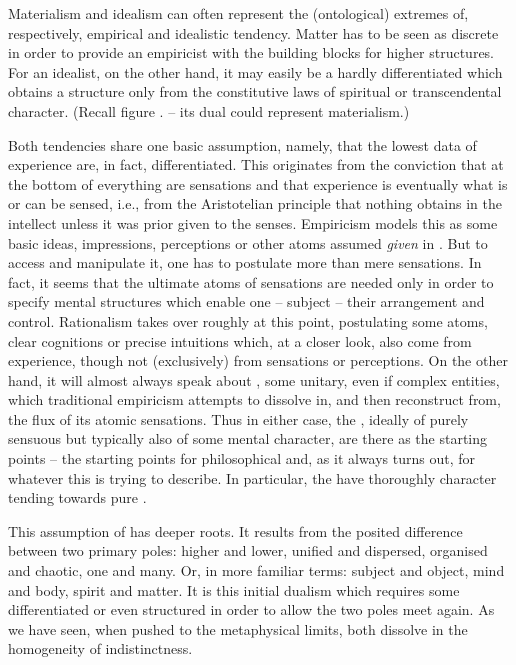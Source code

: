 Materialism and idealism can often represent the (ontological) extremes of,
respectively, empirical and idealistic tendency.  Matter has to be seen as
discrete in order to provide an empiricist with the building blocks for higher
structures.  For an idealist, on the other hand, it may easily be a hardly
differentiated  which obtains a structure only from the
constitutive laws of spiritual or transcendental character. (Recall figure
. -- its dual could represent materialism.)

\pa Both tendencies share one basic assumption, namely, that the lowest data of
experience are, in fact, differentiated.  This originates from the conviction
that at the bottom of everything are  sensations and that
experience is eventually what is or can be sensed, i.e., from the Aristotelian
principle that nothing obtains in the intellect unless it was prior given to the
senses.
Empiricism models this as some basic ideas, impressions, perceptions or other
atoms assumed {\em given} in .  But to access and
manipulate it, one has to postulate more than mere sensations. In fact, it seems
that the ultimate atoms of sensations are needed only in order to specify mental
structures which enable one -- subject -- their arrangement and control.
Rationalism takes over roughly at this point, postulating some 
atoms, clear cognitions or precise intuitions which, at a closer look, also come
from experience, though not (exclusively) from sensations or perceptions.  On
the other hand, it will almost always speak about , some
unitary, even if complex entities, which traditional empiricism attempts to
dissolve in, and then reconstruct from, the flux of its atomic sensations.  Thus
in either case, the , ideally of purely sensuous but typically also
of some mental character, are there as the starting points -- the starting
points for philosophical  and, as it always turns out, for
whatever this  is trying to describe.  In particular, the
 have thoroughly  character tending towards pure
.

This assumption of  has deeper roots. It results from the posited
difference between two primary poles: higher and lower, unified and dispersed,
organised and chaotic, one and many. Or, in more familiar terms: subject and
object, mind and body, spirit and matter.  It is this initial dualism which
requires some differentiated or even structured  in order to allow
the two  poles meet again.  As we have seen, when pushed to the
metaphysical limits, both dissolve in the homogeneity of indistinctness.

